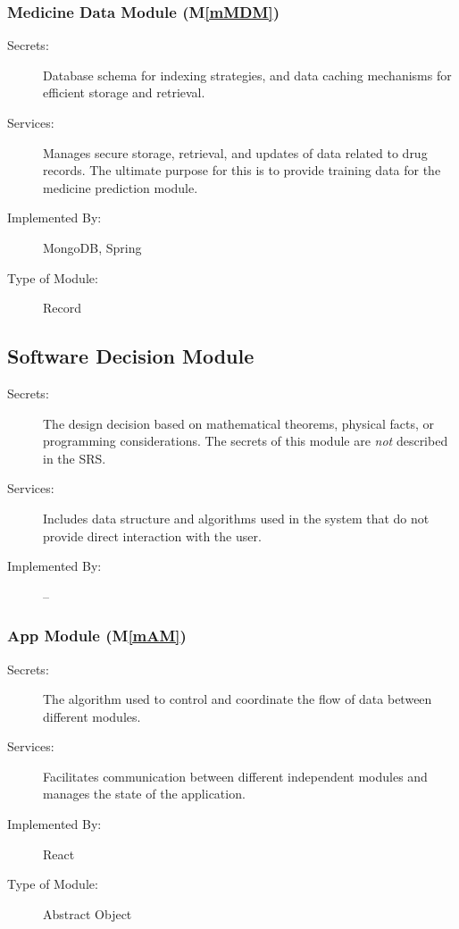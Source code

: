 \documentclass[12pt, titlepage]{article}
\newcommand{\mref}[1]{M\ref{#1}}
\begin{document}
\subsubsection{Medicine Data Module (\mref{mMDM})}

\begin{description}
  \item[Secrets:]Database schema for indexing strategies, and data caching mechanisms for efficient storage and retrieval.
  \item[Services:]Manages secure storage, retrieval, and updates of data related to drug records. The ultimate purpose for this is to provide training data for the medicine prediction module.
  \item[Implemented By:]MongoDB, Spring
  \item[Type of Module:]Record
\end{description}


\subsection{Software Decision Module}

\begin{description}
\item[Secrets:] The design decision based on mathematical theorems, physical facts, or programming considerations. The secrets of this module are
  \emph{not} described in the SRS.
\item[Services:] Includes data structure and algorithms used in the system that do not provide direct interaction with the user. 
\item[Implemented By:] --
\end{description}


\subsubsection{App Module (\mref{mAM})}

\begin{description}
\item[Secrets:] The algorithm used to control and coordinate the flow of data between different modules.
\item[Services:] Facilitates communication between different independent modules and manages the state of the application.
\item[Implemented By:] React
\item[Type of Module:] Abstract Object
\end{description}
\end{document}
